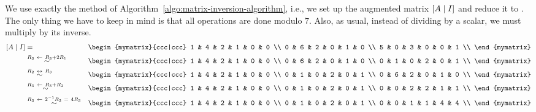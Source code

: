 \begin{solution}
  We use exactly the method of
  Algorithm~\ref{algo:matrix-inversion-algorithm}, i.e., we set up the
  augmented matrix $\left[A\mid I\right]$ and reduce it to {\rref}. The only
  thing we have to keep in mind is that all operations are done modulo
  $7$. Also, as usual, instead of dividing by a scalar, we must
  multiply by its inverse.
  \begin{eqnarray*}
    \mat{A\mid I}
    &=&
        \begin{mymatrix}{ccc|ccc}
          1 & 4 & 2  &  1 & 0 & 0 \\
          0 & 6 & 2  &  0 & 1 & 0 \\
          5 & 0 & 3  &  0 & 0 & 1 \\
        \end{mymatrix}
    \\
    &\stackrel{R_3\rowop R_3+2R_1}{\sim}
      &
        \begin{mymatrix}{ccc|ccc}
          1 & 4 & 2  &  1 & 0 & 0 \\
          0 & 6 & 2  &  0 & 1 & 0 \\
          0 & 1 & 0  &  2 & 0 & 1 \\
        \end{mymatrix}
    \\
    &\stackrel{R_2\rowswap R_3}{\sim}
      &
        \begin{mymatrix}{ccc|ccc}
          1 & 4 & 2  &  1 & 0 & 0 \\
          0 & 1 & 0  &  2 & 0 & 1 \\
          0 & 6 & 2  &  0 & 1 & 0 \\
        \end{mymatrix}
    \\
    &\stackrel{R_3\rowop R_3+R_2}{\sim}
      &
        \begin{mymatrix}{ccc|ccc}
          1 & 4 & 2  &  1 & 0 & 0 \\
          0 & 1 & 0  &  2 & 0 & 1 \\
          0 & 0 & 2  &  2 & 1 & 1 \\
        \end{mymatrix}
    \\
    &\stackrel{R_3\rowop 2^{-1}R_3 ~=~ 4R_3}{\sim}
      &
        \begin{mymatrix}{ccc|ccc}
          1 & 4 & 2  &  1 & 0 & 0 \\
          0 & 1 & 0  &  2 & 0 & 1 \\
          0 & 0 & 1  &  1 & 4 & 4 \\

\end{mymatrix}
\end{eqnarray*}
\end{solution}
